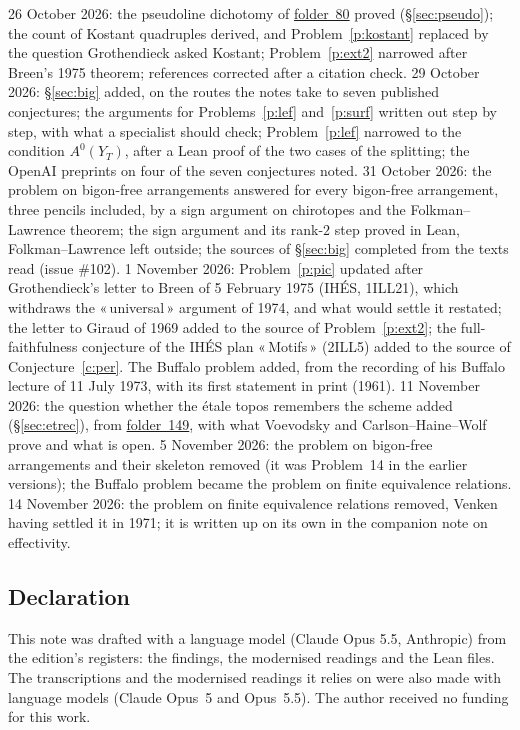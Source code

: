 \documentclass[11pt]{article}
\newcommand{\q}[1]{«\,#1\,»}
\newcommand{\fac}[1]{\href{https://grothendieck.umontpellier.fr/#1.pdf}{folder~#1}}
\theoremstyle{definition}
\theoremstyle{plain}\newtheorem*{proposition}{Proposition}\theoremstyle{definition}
\begin{document}
26 October 2026: the pseudoline dichotomy of \fac{80} proved (\S\ref{sec:pseudo}); the count of Kostant quadruples derived, and Problem~\ref{p:kostant} replaced by the question Grothendieck asked Kostant; Problem~\ref{p:ext2} narrowed after Breen's 1975 theorem; references corrected after a citation check. 29 October 2026: \S\ref{sec:big} added, on the routes the notes take to seven published conjectures; the arguments for Problems~\ref{p:lef} and~\ref{p:surf} written out step by step, with what a specialist should check; Problem~\ref{p:lef} narrowed to the condition $A^0(Y_T)$, after a Lean proof of the two cases of the splitting; the OpenAI preprints on four of the seven conjectures noted. 31 October 2026: the problem on bigon-free arrangements answered for every bigon-free arrangement, three pencils included, by a sign argument on chirotopes and the Folkman--Lawrence theorem; the sign argument and its rank-$2$ step proved in Lean, Folkman--Lawrence left outside; the sources of \S\ref{sec:big} completed from the texts read (issue \#102). 1 November 2026: Problem~\ref{p:pic} updated after Grothendieck's letter to Breen of 5 February 1975 (IHÉS, 1ILL21), which withdraws the \q{universal} argument of 1974, and what would settle it restated; the letter to Giraud of 1969 added to the source of Problem~\ref{p:ext2}; the full-faithfulness conjecture of the IHÉS plan \q{Motifs} (2ILL5) added to the source of Conjecture~\ref{c:per}. The Buffalo problem added, from the recording of his Buffalo lecture of 11 July 1973, with its first statement in print (1961). 11 November 2026: the question whether the étale topos remembers the scheme added (\S\ref{sec:etrec}), from \fac{149}, with what Voevodsky and Carlson--Haine--Wolf prove and what is open. 5 November 2026: the problem on bigon-free arrangements and their skeleton removed (it was Problem~14 in the earlier versions); the Buffalo problem became the problem on finite equivalence relations. 14 November 2026: the problem on finite equivalence relations removed, Venken having settled it in 1971; it is written up on its own in the companion note on effectivity.

\subsection*{Declaration}
This note was drafted with a language model (Claude Opus 5.5, Anthropic) from the edition's registers: the findings, the modernised readings and the Lean files. The transcriptions and the modernised readings it relies on were also made with language models (Claude Opus~5 and Opus~5.5). The author received no funding for this work.
\end{document}
